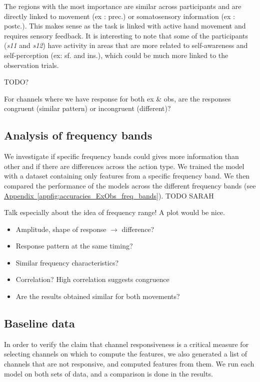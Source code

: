 \documentclass[10pt,conference,compsocconf]{IEEEtran}
\newcommand{\aref}[1]{\hyperref[#1]{Appendix~\ref*{#1}}}
\begin{document}
The regions with the most importance are similar across participants and are directly linked to movement (ex : prec.) or somatosensory information (ex : postc.). This makes sense as the task is linked with active hand movement and requires sensory feedback. It is interesting to note that some of the participants (\textit{s11} and \textit{s12}) have activity in areas that are more related to self-awareness and self-perception (ex: sf. and ins.), which could be much more linked to the observation trials.

TODO?

For channels where we have response for both ex \& obs, are the responses congruent (similar pattern) or incongruent (different)?

\subsection{Analysis of frequency bands}
We investigate if specific frequency bands could gives more information than other and if there are differences across the action type. We trained the model with a dataset containing only features from a specific frequency band. We then compared the performance of the models across the different frequency bands (see \aref{appfig:accuracies_ExObs_freq_bands}).
TODO SARAH

Talk especially about the idea of frequency range! A plot would be nice.

\begin{itemize}
    \item Amplitude, shape of response \(\to\) difference?
    \item Response pattern at the same timing?
    \item Similar frequency characteristics?
    \item Correlation? High correlation suggests congruence
    \item Are the results obtained similar for both movements?
\end{itemize}

\subsection{Baseline data}
In order to verify the claim that channel responsiveness is a critical measure for selecting channels on which to compute the features, we also generated a list of channels that are not responsive, and computed features from them. We run each model on both sets of data, and a comparison is done in the results.
\end{document}
